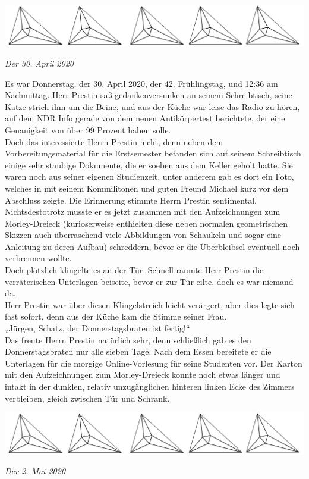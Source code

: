 \documentclass[oneside]{memoir}
\newcommand{\parasep}{
\bigskip
\bigskip
\begin{center} 
   \includegraphics[scale=.08]{parasep5.jpg} 
\end{center}
\bigskip
\bigskip
}
\begin{document}
\parasep

\textit{Der 30. April 2020}

\medskip
\noindent Es war Donnerstag, der 30. April 2020, der 42. Frühlingstag, und 12:36 am Nachmittag. Herr Prestin saß gedankenversunken an seinem Schreibtisch, seine Katze strich ihm um die Beine, und aus der Küche war leise das Radio zu hören, auf dem NDR Info gerade von dem neuen Antikörpertest berichtete, der eine Genauigkeit von über 99 Prozent haben solle. \\
Doch das interessierte Herrn Prestin nicht, denn neben dem Vorbereitungsmaterial für die Erstsemester befanden sich auf seinem Schreibtisch einige sehr staubige Dokumente, die er soeben aus dem Keller geholt hatte. Sie waren noch aus seiner eigenen Studienzeit, unter anderem gab es dort ein Foto, welches in mit seinem Kommilitonen und guten Freund Michael kurz vor dem Abschluss zeigte. Die Erinnerung stimmte Herrn Prestin sentimental. Nichtsdestotrotz musste er es jetzt zusammen mit den Aufzeichnungen zum Morley-Dreieck (kurioserweise enthielten diese neben normalen geometrischen Skizzen auch überraschend viele Abbildungen von Schaukeln und sogar eine Anleitung zu deren Aufbau) schreddern, bevor er die Überbleibsel eventuell noch verbrennen wollte. \\
Doch plötzlich klingelte es an der Tür. Schnell räumte Herr Prestin die verräterischen Unterlagen beiseite, bevor er zur Tür eilte, doch es war niemand da. \\
Herr Prestin war über diesen Klingelstreich leicht verärgert, aber dies legte sich fast sofort, denn aus der Küche kam die Stimme seiner Frau. \\
„Jürgen, Schatz, der Donnerstagsbraten ist fertig!“ \\
Das freute Herrn Prestin natürlich sehr, denn schließlich gab es den Donnerstagsbraten nur alle sieben Tage. Nach dem Essen bereitete er die Unterlagen für die morgige Online-Vorlesung für seine Studenten vor. Der Karton mit den Aufzeichnungen zum Morley-Dreieck konnte noch etwas länger und intakt in der dunklen, relativ unzugänglichen hinteren linken Ecke des Zimmers verbleiben, gleich zwischen Tür und Schrank.
     
\parasep

\textit{Der 2. Mai 2020}
\end{document}
